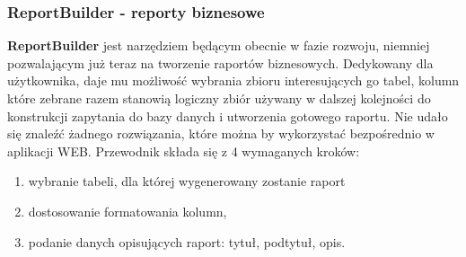 \subsubsection{ReportBuilder - reporty biznesowe}
	\textbf{ReportBuilder} jest narzędziem będącym obecnie w fazie rozwoju, niemniej pozwalającym już teraz na tworzenie raportów biznesowych. Dedykowany dla użytkownika, daje mu możliwość wybrania zbioru interesujących go tabel, kolumn które zebrane razem stanowią logiczny zbiór używany w dalszej kolejności do konstrukcji zapytania do bazy danych i utworzenia gotowego raportu. Nie udało się znaleźć żadnego rozwiązania, które można by wykorzystać bezpośrednio w aplikacji WEB. Przewodnik składa się z 4 wymaganych kroków:
	\begin{enumerate}
		\item wybranie tabeli, dla której wygenerowany zostanie raport
		\item dostosowanie formatowania kolumn,
		\item podanie danych opisujących raport: tytuł, podtytuł, opis.
	\end{enumerate}		
	
